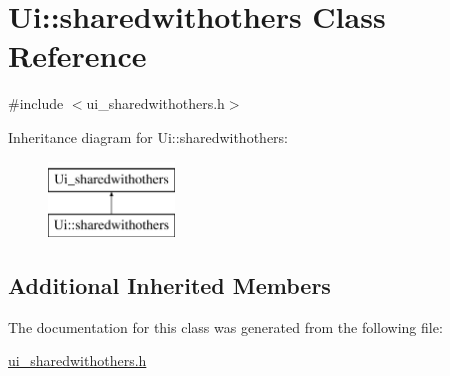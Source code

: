 \hypertarget{classUi_1_1sharedwithothers}{\section{Ui\-:\-:sharedwithothers Class Reference}
\label{classUi_1_1sharedwithothers}
}


{\ttfamily \#include $<$ui\-\_\-sharedwithothers.\-h$>$}

Inheritance diagram for Ui\-:\-:sharedwithothers\-:\begin{figure}[H]
\begin{center}
\leavevmode
\includegraphics[height=2.000000cm]{classUi_1_1sharedwithothers}
\end{center}
\end{figure}
\subsection*{Additional Inherited Members}


The documentation for this class was generated from the following file\-:\begin{DoxyCompactItemize}
\item 
\hyperlink{ui__sharedwithothers_8h}{ui\-\_\-sharedwithothers.\-h}\end{DoxyCompactItemize}
